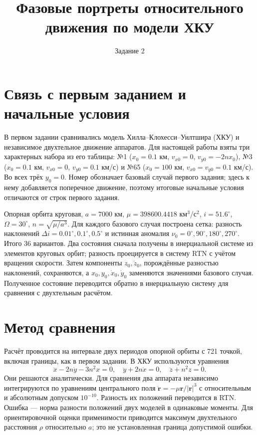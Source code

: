 \documentclass[12pt,a4paper]{article}
\title{Фазовые портреты относительного движения по модели ХКУ}
\author{Задание 2}
\date{}
\begin{document}
\maketitle
\section{Связь с первым заданием и начальные условия}
В первом задании сравнивались модель Хилла--Клохесси--Уилтшира (ХКУ) и независимое двухтельное движение аппаратов. Для настоящей работы взяты три характерных набора из его таблицы: №1 ($x_0=0.1$ км, $v_{x0}=0$, $v_{y0}=-2nx_0$), №3 ($x_0=0.1$ км, $v_{x0}=0$, $v_{y0}=0.1$ км/с) и №65 ($x_0=100$ км, $v_{x0}=v_{y0}=0.1$ км/с). Во всех трёх $y_0=0$. Номер обозначает базовый случай первого задания; здесь к нему добавляется поперечное движение, поэтому итоговые начальные условия отличаются от строк первого задания.

Опорная орбита круговая, $a=7000$ км, $\mu=398600.4418$ км$^3$/с$^2$, $i=51.6^\circ$, $\Omega=30^\circ$, $n=\sqrt{\mu/a^3}$. Для каждого базового случая построена сетка: разность наклонений $\Delta i=0.01^\circ,0.1^\circ,0.5^\circ$ и истинная аномалия $\nu_0=0^\circ,90^\circ,180^\circ,270^\circ$. Итого 36 вариантов. Два состояния сначала получены в инерциальной системе из элементов круговых орбит; разность проецируется в систему RTN с учётом вращения скорости. Затем компоненты $z_0,\dot z_0$, порождённые разностью наклонений, сохраняются, а $x_0,y_0,\dot x_0,\dot y_0$ заменяются значениями базового случая. Полученное состояние переводится обратно в инерциальную систему для сравнения с двухтельным расчётом.

\section{Метод сравнения}
Расчёт проводится на интервале двух периодов опорной орбиты с 721 точкой, включая границы, как в первом задании. В ХКУ используются уравнения
\[\ddot x-2n\dot y-3n^2x=0,\quad \ddot y+2n\dot x=0,\quad \ddot z+n^2z=0.\]
Они решаются аналитически. Для сравнения два аппарата независимо интегрируются по уравнениям центрального поля $\ddot{\mathbf r}=-\mu\mathbf r/|\mathbf r|^3$ с относительным и абсолютным допуском $10^{-10}$. Разность их положений переводится в RTN. Ошибка — норма разности положений двух моделей в одинаковые моменты. Для ориентировочной оценки применимости приводится максимум двухтельного расстояния $\rho$ относительно $a$; это не установленная граница допустимой ошибки.
\end{document}

